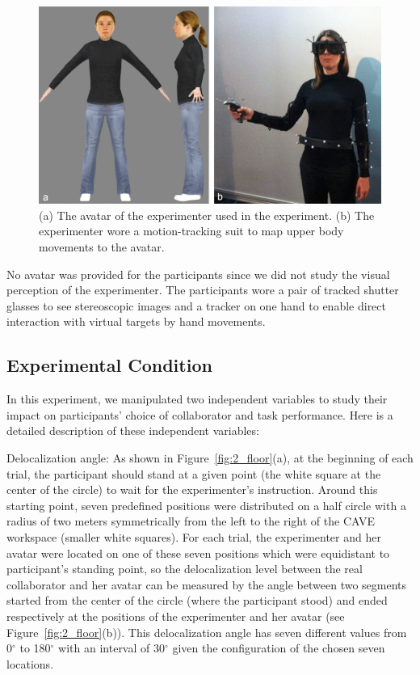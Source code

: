 \begin{figure}[ht]
  \centering
  \includegraphics[width=\textwidth]{figures/2_avatar_photo}
  \caption{\label{fig:2_avatar}(a) The avatar of the experimenter used in the experiment. (b) The experimenter wore a motion-tracking suit to map upper body movements to the avatar.}
\end{figure}

No avatar was provided for the participants since we did not study the visual perception of the experimenter. The participants wore a pair of tracked shutter glasses to see stereoscopic images and a tracker on one hand to enable direct interaction with virtual targets by hand movements.

\subsection{Experimental Condition}
In this experiment, we manipulated two independent variables to study their impact on participants' choice of collaborator and task performance. Here is a detailed description of these independent variables:

Delocalization angle: As shown in Figure~\ref{fig:2_floor}(a), at the beginning of each trial, the participant should stand at a given point (the white square at the center of the circle) to wait for the experimenter's instruction. Around this starting point, seven predefined positions were distributed on a half circle with a radius of two meters symmetrically from the left to the right of the CAVE workspace (smaller white squares). For each trial, the experimenter and her avatar were located on one of these seven positions which were equidistant to participant's standing point, so the delocalization level between the real collaborator and her avatar can be measured by the angle between two segments started from the center of the circle (where the participant stood) and ended respectively at the positions of the experimenter and her avatar (see Figure~\ref{fig:2_floor}(b)). This delocalization angle has seven different values from 0$^\circ$ to 180$^\circ$ with an interval of 30$^\circ$ given the configuration of the chosen seven locations.

